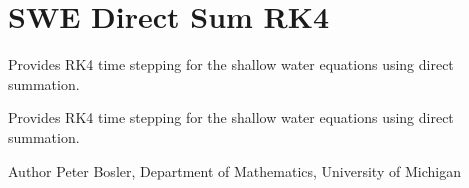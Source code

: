 \hypertarget{group___s_w_e_direct_sum}{\section{S\+W\+E Direct Sum R\+K4}
\label{group___s_w_e_direct_sum}
}


Provides R\+K4 time stepping for the shallow water equations using direct summation.  


Provides R\+K4 time stepping for the shallow water equations using direct summation. 

\begin{DoxyAuthor}{Author}
Peter Bosler, Department of Mathematics, University of Michigan 
\end{DoxyAuthor}
